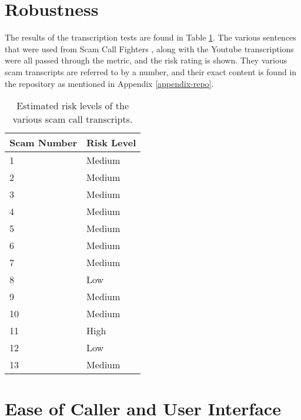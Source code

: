 \documentclass[main.tex]{subfiles}
\begin{document}
\section{Robustness}
The results of the transcription tests are found in Table \ref{tbl:robust}. The various sentences that were used from Scam Call Fighters \cite{spam-calls}, along with the Youtube transcriptions were all passed through the metric, and the risk rating is shown. They various scam transcripts are referred to by a number, and their exact content is found in the repository as mentioned in Appendix \ref{appendix-repo}.

\begin{table}[h]
\centering
\begin{tabular}{|l|l|}
	\hline
\textbf{Scam Number} & \textbf{Risk Level}                                 \\\hline
1           & Medium                                                    \\
2           & Medium                                                   \\
3           & Medium                                                 \\
4           & Medium                                                 \\
5           & Medium                                                 \\
6           & Medium                                                \\
7           & Medium                                                \\
8           & Low                                                \\
9           & Medium                                                \\
10           & Medium                                                \\
11           & High                                                \\
12           & Low                                                \\
13           & Medium  \\\hline
\end{tabular}
\caption{Estimated risk levels of the various scam call transcripts. }
\label{tbl:robust}
\end{table}

\section{Ease of Caller and User Interface}
\end{document}
